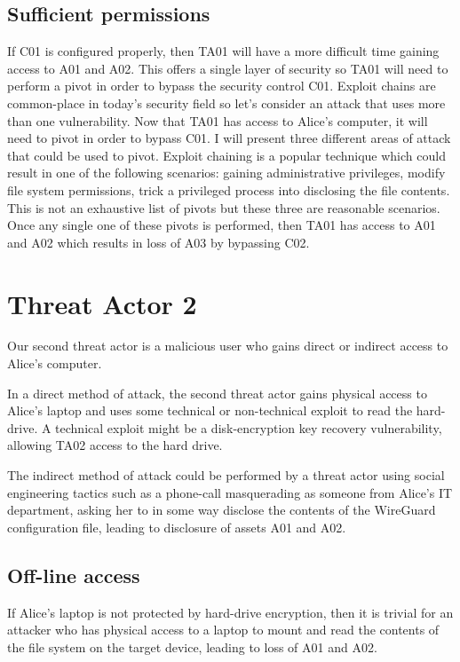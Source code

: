 \documentclass [11pt, proquest] {uwthesis}[2020/02/24]
\begin{document}
\subsection{Sufficient permissions}
If C01 is configured properly, then TA01 will have a more difficult time gaining access to A01 and A02. This offers a single layer of security so TA01 will need to perform a pivot in order to bypass the security control C01. Exploit chains are common-place in today's security field so let's consider an attack that uses more than one vulnerability. Now that TA01 has access to Alice's computer, it will need to pivot in order to bypass C01. I will present three different areas of attack that could be used to pivot. Exploit chaining is a popular technique which could result in one of the following scenarios: gaining administrative privileges, modify file system permissions, trick a privileged process into disclosing the file contents. This is not an exhaustive list of pivots but these three are reasonable scenarios. Once any single one of these pivots is performed, then TA01 has access to A01 and A02 which results in loss of A03 by bypassing C02.

\section{Threat Actor 2}
Our second threat actor is a malicious user who gains direct or indirect access to Alice's computer. 

In a direct method of attack, the second threat actor gains physical access to Alice's laptop and uses some technical or non-technical exploit to read the hard-drive. A technical exploit might be a disk-encryption key recovery vulnerability, allowing TA02 access to the hard drive. 

The indirect method of attack could be performed by a threat actor using social engineering tactics such as a phone-call masquerading as someone from Alice's IT department, asking her to in some way disclose the contents of the WireGuard configuration file, leading to disclosure of assets A01 and A02.

\subsection{Off-line access}
If Alice's laptop is not protected by hard-drive encryption, then it is trivial for an attacker who has physical access to a laptop to mount and read the contents of the file system on the target device, leading to loss of A01 and A02.
\end{document}
